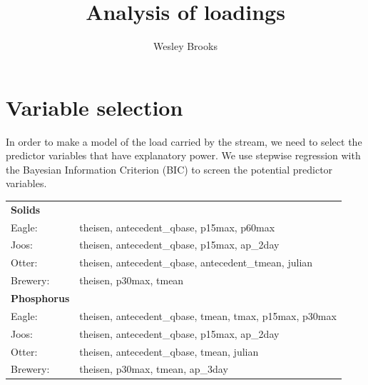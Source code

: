 \documentclass[12pt]{article}
\title{Analysis of loadings}
\author{Wesley Brooks}
\date{}                                           %
\begin{document}
\maketitle








\section{Variable selection}
In order to make a model of the load carried by the stream, we need to select the predictor variables that have explanatory power. We use stepwise regression with the Bayesian Information Criterion (BIC) to screen the potential predictor variables.



\begin{table}[h]
    \begin{center}
    \begin{tabular}{ll}
        \textbf{Solids} & \\
        \hspace{5mm} Eagle: & theisen, antecedent\_qbase, p15max, p60max\\
        \hspace{5mm} Joos: & theisen, antecedent\_qbase, p15max, ap\_2day\\
        \hspace{5mm} Otter: & theisen, antecedent\_qbase, antecedent\_tmean, julian\\
        \hspace{5mm} Brewery: & theisen, p30max, tmean
    \vspace{2mm}\\
        \textbf{Phosphorus} & \\
        \hspace{5mm} Eagle: & theisen, antecedent\_qbase, tmean, tmax, p15max, p30max\\
        \hspace{5mm} Joos: & theisen, antecedent\_qbase, p15max, ap\_2day\\
        \hspace{5mm} Otter: & theisen, antecedent\_qbase, tmean, julian\\
        \hspace{5mm} Brewery: & theisen, p30max, tmean, ap\_3day\\
    \end{tabular}
    \end{center}
\end{table}
\end{document}

